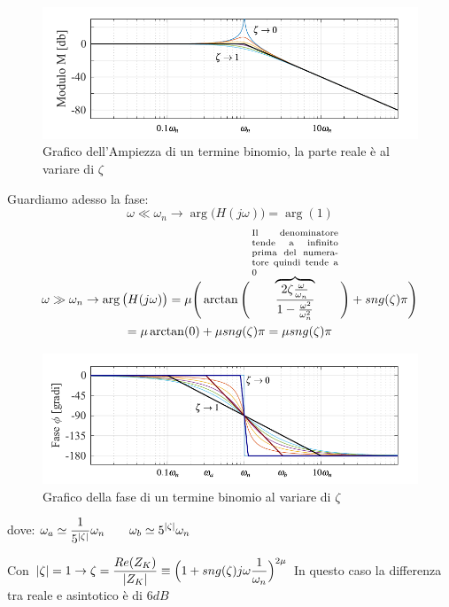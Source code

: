 \begin{figure}[H]
	\centering
	\includegraphics[width=0.8\linewidth]{immagini/cap6_Bode/bodeBin-amp.pdf}
	\caption{Grafico dell'Ampiezza di un termine binomio, la parte reale è al variare di $ \zeta $}
	\label{fig:bodeBin-Amp}
\end{figure}

Guardiamo adesso la fase:
\begin{equation*}
	\omega \ll \omega_n \rightarrow \arg \big(H(j\omega)\big) = \arg(1)
\end{equation*}
\begin{multline*}
	\omega \gg \omega_n \rightarrow \arg \big(H(j\omega)\big) = \mu \Bigg(\arctan\Bigg(\overbrace{\frac{2\zeta\frac{\omega}{\omega_n}}{1-\frac{\omega^2}{\omega^{2}_{n}}}}^{\parbox{7
			em}{\scriptsize Il denominatore tende a infinito prima del numeratore quindi tende a 0}}\Bigg)+ \sng(\zeta)\pi\Bigg) \\= \mu \arctan(0) + \mu \sng(\zeta)\pi = \mu \sng(\zeta)\pi
\end{multline*}

\begin{figure}[H]
	\centering
	\includegraphics[width=0.8\linewidth]{immagini/cap6_Bode/bodeBin-fas.pdf}
	\caption{Grafico della fase di un termine binomio al variare di $ \zeta $}
	\label{fig:bodeBin-Fas}
\end{figure}
dove: $\displaystyle \omega_a \simeq \frac{1}{5^{\lvert\zeta\rvert}}\omega_n \qquad \omega_b \simeq 5^{\lvert\zeta\rvert}\omega_n$


	Con $\displaystyle \lvert\zeta\rvert=1 \rightarrow \zeta =\frac{Re (Z_K)}{\lvert Z_K\rvert} \equiv \Big(1+sng(\zeta)j \omega \frac{1}{\omega_n}\Big)^{2\mu} $  In questo caso la differenza tra reale e asintotico è di $ 6 dB $
	
